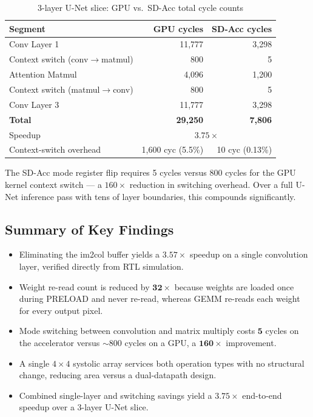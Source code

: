 \documentclass[11pt, letterpaper]{article}
\begin{document}
\begin{table}[h]
\centering
\caption{3-layer U-Net slice: GPU vs.\ SD-Acc total cycle counts}
\begin{tabular}{lrr}
\toprule
\textbf{Segment} & \textbf{GPU cycles} & \textbf{SD-Acc cycles} \\
\midrule
Conv Layer 1              & 11,777  & 3,298  \\
Context switch (conv$\to$matmul) & 800     & 5      \\
Attention Matmul          & 4,096   & 1,200  \\
Context switch (matmul$\to$conv) & 800     & 5      \\
Conv Layer 3              & 11,777  & 3,298  \\
\midrule
\textbf{Total}            & \textbf{29,250} & \textbf{7,806} \\
\midrule
Speedup                   & \multicolumn{2}{c}{$3.75\times$} \\
Context-switch overhead   & 1,600 cyc (5.5\%) & 10 cyc (0.13\%) \\
\bottomrule
\end{tabular}
\end{table}

The SD-Acc mode register flip requires 5 cycles versus 800 cycles for the GPU
kernel context switch — a $160\times$ reduction in switching overhead. Over a
full U-Net inference pass with tens of layer boundaries, this compounds
significantly.

\subsection{Summary of Key Findings}

\begin{itemize}
  \item Eliminating the im2col buffer yields a $\mathbf{3.57\times}$ speedup
        on a single convolution layer, verified directly from RTL simulation.
  \item Weight re-read count is reduced by $\mathbf{32\times}$ because weights
        are loaded once during PRELOAD and never re-read, whereas GEMM re-reads
        each weight for every output pixel.
  \item Mode switching between convolution and matrix multiply costs
        $\mathbf{5}$ cycles on the accelerator versus $\sim$800 cycles on a
        GPU, a $\mathbf{160\times}$ improvement.
  \item A single $4\times4$ systolic array services both operation types with
        no structural change, reducing area versus a dual-datapath design.
  \item Combined single-layer and switching savings yield a
        $\mathbf{3.75\times}$ end-to-end speedup over a 3-layer U-Net slice.
\end{itemize}
\end{document}
